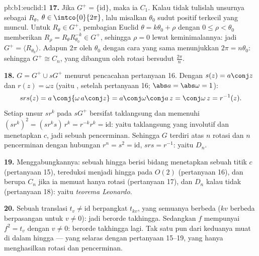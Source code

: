 \begin{solution}{pb:b1:euclid:1}
\textbf{17.} Jika $G^{+} = \{\mathrm{id}\}$, maka ia $C_1$.
Kalau tidak tulislah unsurnya sebagai $R_\theta$, $\theta \in
\intco{0}{2\pi}$, lalu misalkan $\theta_0$ sudut positif
terkecil yang muncul. Untuk $R_\theta \in G^{+}$, pembagian Euclid
$\theta = k\theta_0 + \rho$ dengan $0 \leq \rho < \theta_0$ memberikan
$R_\rho = R_\theta R_{\theta_0}^{-k} \in G^{+}$, sehingga $\rho = 0$
lewat keminimalannya: jadi $G^{+} = \langle R_{\theta_0}\rangle$. Adapun 
$2\pi$ oleh $\theta_0$ dengan cara yang sama menunjukkan $2\pi = n\theta_0$:
sehingga $G^{+} \cong C_n$, yang dibangun oleh rotasi bersudut
$\frac{2\pi}n$.

\textbf{18.} $G = G^{+} \cup sG^{+}$ menurut pencacahan
pertanyaan 16. Dengan $s(z) = a\conj z$ dan $r(z) = \omega z$
(yaitu , setelah pertanyaan 16; $\abs a = \abs\omega = 1$):
\[
s r s(z) = a\,\conj{\omega\,a\conj z}
= a\conj\omega\conj a\,z = \conj\omega\,z = r^{-1}(z) .
\]
Setiap unsur $sr^k$ pada $sG^{+}$ bersifat taklangsung dan memenuhi
$(sr^k)^2 = (sr^ks)\,r^k = r^{-k}r^k = \mathrm{id}$: yaitu
 taklangsung yang involutif dan menetapkan $c$, jadi sebuah pencerminan. Sehingga
$G$ terdiri atas $n$ rotasi dan $n$ pencerminan dengan
hubungan $r^n = s^2 = \mathrm{id}$, $srs = r^{-1}$: yaitu
 $D_n$.

\textbf{19.} Menggabungkannya: sebuah  hingga berisi  bidang
menetapkan sebuah titik $c$ (pertanyaan 15), tereduksi menjadi  hingga
pada $O(2)$ (pertanyaan 16), dan berupa $C_n$ jika ia memuat hanya
rotasi (pertanyaan 17), dan $D_n$ kalau tidak (pertanyaan 18):
yaitu \emph{teorema Leonardo}.

\textbf{20.} Sebuah translasi $t_v \neq \mathrm{id}$ berpangkat
$t_{kv}$, yang semuanya berbeda ($kv$ berbeda berpasangan untuk $v \neq 0$):
jadi berorde takhingga. Sedangkan  $f$ mempunyai $f^2 = t_v$ dengan $v
\neq 0$: berorde takhingga lagi. Tak satu pun dari keduanya muat di dalam  hingga
--- yang selaras dengan pertanyaan 15--19, yang hanya menghasilkan
rotasi dan pencerminan.


\end{solution}

